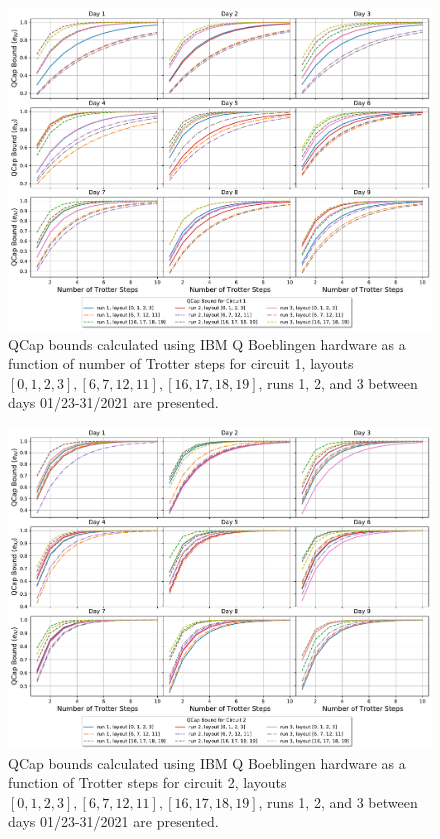 \begin{figure}[ht!]
    \includegraphics[scale=0.5]{QCapBoundForEachDay_Circ1.pdf}
    \caption{QCap bounds calculated using IBM Q Boeblingen hardware as a function of number of Trotter steps for circuit 1, layouts $[0,1,2,3],[6,7,12,11],[16,17,18,19]$, runs 1, 2, and 3 between days 01/23-31/2021 are presented.}
    \label{fig:QCapCirc1}
\end{figure}
\begin{figure}[ht!]
    \includegraphics[scale=0.5]{QCapBoundForEachDay_Circ2.pdf}
    \caption{QCap bounds calculated using IBM Q Boeblingen hardware as a function of Trotter steps for circuit 2, layouts $[0,1,2,3],[6,7,12,11],[16,17,18,19]$, runs 1, 2, and 3 between days 01/23-31/2021 are presented.}
    \label{fig:QCapCirc2}
\end{figure}

